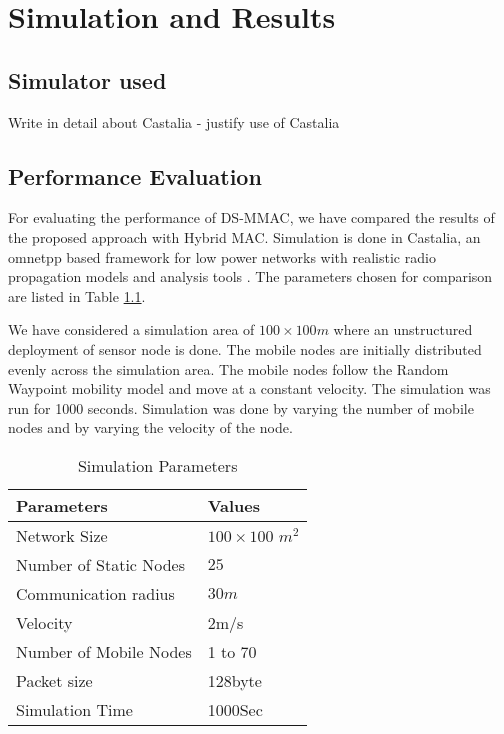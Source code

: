 
\chapter{Simulation and Results} %

\label{simulacra} %



\section{Simulator used}
Write in detail about Castalia - justify use of Castalia


\section{Performance Evaluation}


For evaluating the performance of DS-MMAC, we have compared the results of the proposed approach with Hybrid MAC\cite{hmac}. Simulation is done in Castalia, an omnetpp based framework for low power networks with realistic radio propagation models and analysis tools \cite{castalia}. The parameters chosen for comparison are listed in Table \ref{sim_para}.

We have considered a simulation area of $100 \times 100m$ where an unstructured deployment of sensor node is done. The mobile nodes are initially distributed evenly across the simulation area. The mobile nodes follow the Random Waypoint mobility model and move at a constant velocity. The simulation was run for 1000 seconds. Simulation was done by varying the number of mobile nodes and by varying the velocity of the node.


\begin{table}[h]\scriptsize
\begin{center}
\caption{Simulation Parameters}
\label{sim_para}
    \begin{tabular}{ | l |p{3cm} |}
    \hline
Parameters & Values \\  \hline
Network Size & $100 \times 100 $ $m^2$ \\ \hline
Number of Static Nodes & $25$ \\ \hline
Communication radius & $30m$ \\ \hline
Velocity & 2m/s \\ \hline
Number of Mobile Nodes & 1 to 70 \\ \hline
Packet size & 128byte \\ \hline
Simulation Time & 1000Sec \\ \hline
    \end{tabular}
\end{center}
\end{table}


